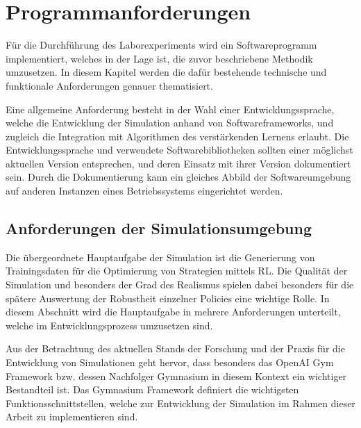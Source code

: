 \section{Programmanforderungen}

Für die Durchführung des Laborexperiments wird ein Softwareprogramm implementiert, welches in der Lage ist, die zuvor beschriebene Methodik umzusetzen.
In diesem Kapitel werden die dafür bestehende technische und funktionale Anforderungen genauer thematisiert. 

Eine allgemeine Anforderung besteht in der Wahl einer Entwicklungssprache, welche die Entwicklung der Simulation anhand von Softwareframeworks, und zugleich die Integration mit Algorithmen des verstärkenden Lernens erlaubt.
Die Entwicklungssprache und verwendete Softwarebibliotheken sollten einer möglichst aktuellen Version entsprechen, und deren Einsatz mit ihrer Version dokumentiert sein.
Durch die Dokumentierung kann ein gleiches Abbild der Softwareumgebung auf anderen Instanzen eines Betriebssystems eingerichtet werden. 

\subsection{Anforderungen der Simulationsumgebung}

Die übergeordnete Hauptaufgabe der Simulation ist die Generierung von Trainingsdaten für die Optimierung von Strategien mittels RL.
Die Qualität der Simulation und besonders der Grad des Realismus spielen dabei besonders für die spätere Auswertung der Robustheit einzelner Policies eine wichtige Rolle.
In diesem Abschnitt wird die Hauptaufgabe in mehrere Anforderungen unterteilt, welche im Entwicklungsprozess umzusetzen sind.

Aus der Betrachtung des aktuellen Stands der Forschung und der Praxis für die Entwicklung von Simulationen geht hervor, dass besonders das OpenAI Gym Framework bzw. dessen Nachfolger Gymnasium in diesem Kontext ein wichtiger Bestandteil ist.
Das Gymnasium Framework definiert die wichtigsten Funktionsschnittstellen, welche zur Entwicklung der Simulation im Rahmen dieser Arbeit zu implementieren sind.


